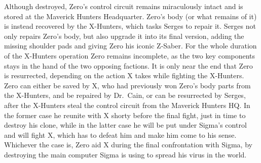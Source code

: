 Although destroyed, Zero's control circuit remains miraculously intact and is stored at the Maverick Hunters Headquarter. Zero's body (or what remains of it) is instead recovered by the X-Hunters, which tasks Serges to repair it. Serges not only repairs Zero's body, but also upgrade it into its final version, adding the missing shoulder pads and giving Zero his iconic Z-Saber. For the whole duration of the X-Hunters operation Zero remains incomplete, as the two key components stays in the hand of the two opposing factions. It is only near the end that Zero is resurrected, depending on the action X takes while fighting the X-Hunters. Zero can either be saved by X, who had previously won Zero's body parts from the X-Hunters, and be repaired by Dr.~Cain, or can be resurrected by Serges, after the X-Hunters steal the control circuit from the Maverick Hunters HQ. In the former case he reunite with X shorty before the final fight, just in time to destroy his clone, while in the latter case he will be put under Sigma's control and will fight X, which has to defeat him and make him come to his sense. Whichever the case is, Zero aid X during the final confrontation with Sigma, by destroying the main computer Sigma is using to spread his virus in the world.